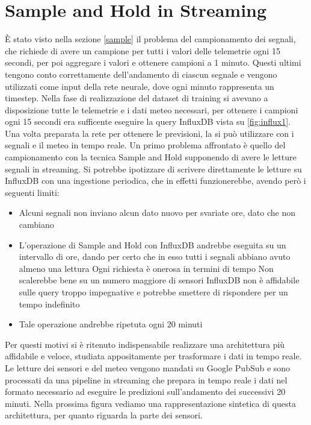 \chapter{Sample and Hold in Streaming}\label{sampleholdstream}
È stato visto nella sezione \ref{sample} il problema del campionamento dei segnali, che richiede di avere un campione per tutti i valori delle telemetrie ogni 15 secondi, per poi aggregare i valori e ottenere campioni a 1 minuto. Questi ultimi tengono conto correttamente dell'andamento di ciascun segnale e vengono utilizzati come input della rete neurale, dove ogni minuto rappresenta un timestep. Nella fase di realizzazione del dataset di training si avevano a disposizione tutte le telemetrie e i dati meteo necessari, per ottenere i campioni ogni 15 secondi era sufficente eseguire la query InfluxDB vista su \ref{fig:influx1}. Una volta preparata la rete per ottenere le previsioni, la si può utilizzare con i segnali e il meteo in tempo reale. Un primo problema affrontato è quello del campionamento con la tecnica Sample and Hold supponendo di avere le letture segnali in streaming. Si potrebbe ipotizzare di scrivere direttamente le letture su InfluxDB con una ingestione periodica, che in effetti funzionerebbe, avendo però i seguenti limiti:
\begin{itemize}
	\item Alcuni segnali non inviano alcun dato nuovo per svariate ore, dato che non cambiano
	\item L'operazione di Sample and Hold con InfluxDB andrebbe eseguita su un intervallo di ore, dando per certo che in esso tutti i segnali abbiano avuto almeno una lettura
	\subitem Ogni richiesta è onerosa in termini di tempo
	\subitem Non scalerebbe bene su un numero maggiore di sensori
	\subitem InfluxDB non è affidabile sulle query troppo impegnative e potrebbe smettere di rispondere per un tempo indefinito
	\item Tale operazione andrebbe ripetuta ogni 20 minuti
\end{itemize} 
Per questi motivi si è ritenuto indispensabile realizzare una architettura più affidabile e veloce, studiata appositamente per trasformare i dati in tempo reale. Le letture dei sensori e del meteo vengono mandati su Google PubSub e sono processati da una pipeline in streaming che prepara in tempo reale i dati nel formato necessario ad eseguire le predizioni sull'andamento dei successivi 20 minuti. Nella prossima figura vediamo una rappresentazione sintetica di questa architettura, per quanto riguarda la parte dei sensori.
\svg
